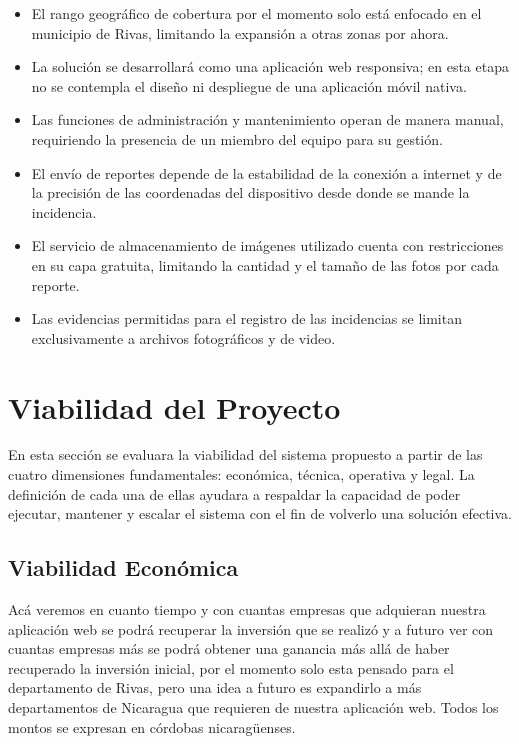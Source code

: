 \begin{itemize}
	\item El rango geográfico de cobertura por el momento solo está enfocado en el municipio de Rivas, limitando la expansión a otras zonas por ahora.
	
	\item La solución se desarrollará como una aplicación web responsiva; en esta etapa no se contempla el diseño ni despliegue de una aplicación móvil nativa.

	\item Las funciones de administración y mantenimiento operan de manera manual, requiriendo la presencia de un miembro del equipo para su gestión.
	\item El envío de reportes depende de la estabilidad de la conexión a internet y de la precisión de las coordenadas del dispositivo desde donde se mande la incidencia.
	
	\item El servicio de almacenamiento de imágenes utilizado cuenta con restricciones en su capa gratuita, limitando la cantidad y el tamaño de las fotos por cada reporte.
	
	\item Las evidencias permitidas para el registro de las incidencias se limitan exclusivamente a archivos fotográficos y de video.
\end{itemize}

\section{Viabilidad del Proyecto}
En esta sección se evaluara la viabilidad del sistema propuesto a partir de las cuatro dimensiones fundamentales: económica, técnica, operativa y legal. La definición de cada una de ellas ayudara a respaldar la capacidad de poder ejecutar, mantener y escalar el sistema con el fin de volverlo una solución efectiva.

\subsection{Viabilidad Económica}
\label{subsec:economica}
Acá veremos en cuanto tiempo y con cuantas empresas que adquieran nuestra aplicación web se podrá recuperar la inversión que se realizó y a futuro ver con cuantas empresas más se podrá obtener una ganancia más allá de haber recuperado la inversión inicial, por el momento solo esta pensado para el departamento de Rivas, pero una idea a futuro es expandirlo a más departamentos de Nicaragua que requieren de nuestra aplicación web. Todos los montos se expresan en córdobas nicaragüenses.

